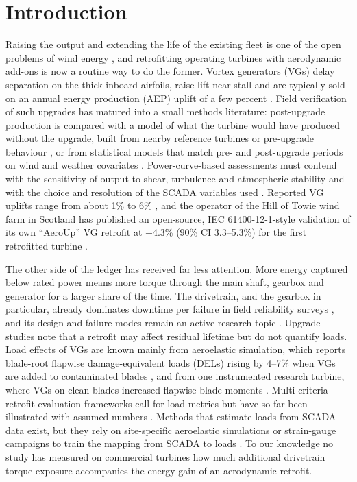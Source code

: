 \documentclass[preprint,12pt]{elsarticle}
\begin{document}
\linenumbers

\section{Introduction}

Raising the output and extending the life of the existing fleet is one of the open problems of wind energy \cite{veers19}, and retrofitting operating turbines with aerodynamic add-ons is now a routine way to do the former. Vortex generators (VGs) delay separation on the thick inboard airfoils, raise lift near stall and are typically sold on an annual energy production (AEP) uplift of a few percent \cite{lin02,zhao,mueller,baldacchino18,skrzypinski14}. Field verification of such upgrades has matured into a small methods literature: post-upgrade production is compared with a model of what the turbine would have produced without the upgrade, built from nearby reference turbines or pre-upgrade behaviour \cite{astolfi18,astolfi19,terzi,castellani}, or from statistical models that match pre- and post-upgrade periods on wind and weather covariates \cite{lee15,shin18,latiffianti22}. Power-curve-based assessments must contend with the sensitivity of output to shear, turbulence and atmospheric stability \cite{wagner09,stmartin16} and with the choice and resolution of the SCADA variables used \cite{gonzalez19,astolfi21}. Reported VG uplifts range from about 1\% to 6\% \cite{astolfi18,manolesos,moon,hwangbo17}, and the operator of the Hill of Towie wind farm in Scotland has published an open-source, IEC 61400-12-1-style \cite{iec} validation of its own ``AeroUp'' VG retrofit at +4.3\% (90\% CI 3.3--5.3\%) for the first retrofitted turbine \cite{clerc}.

The other side of the ledger has received far less attention. More energy captured below rated power means more torque through the main shaft, gearbox and generator for a larger share of the time. The drivetrain, and the gearbox in particular, already dominates downtime per failure in field reliability surveys \cite{ribrant,tavner07,spinato,faulstich11,pinar,carroll16,artigao}, and its design and failure modes remain an active research topic \cite{nejad22}. Upgrade studies note that a retrofit may affect residual lifetime \cite{astolfi19} but do not quantify loads. Load effects of VGs are known mainly from aeroelastic simulation, which reports blade-root flapwise damage-equivalent loads (DELs) rising by 4--7\% when VGs are added to contaminated blades \cite{kim}, and from one instrumented research turbine, where VGs on clean blades increased flapwise blade moments \cite{bak}. Multi-criteria retrofit evaluation frameworks call for load metrics but have so far been illustrated with assumed numbers \cite{ji}. Methods that estimate loads from SCADA data exist, but they rely on site-specific aeroelastic simulations or strain-gauge campaigns to train the mapping from SCADA to loads \cite{noppe18,veratudela17,dimitrov18}. To our knowledge no study has measured on commercial turbines how much additional drivetrain torque exposure accompanies the energy gain of an aerodynamic retrofit.
\end{document}
